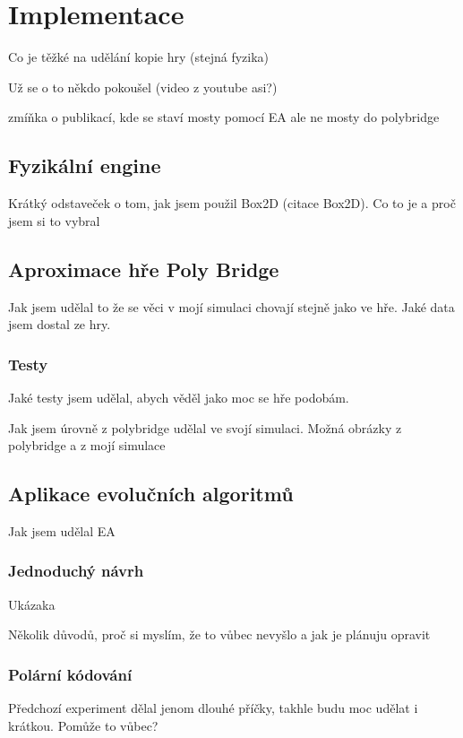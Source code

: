 \chapter{Implementace}

Co je těžké na udělání kopie hry (stejná fyzika)

Už se o to někdo pokoušel (video z youtube asi?)

zmíňka o publikací, kde se staví mosty pomocí EA ale ne mosty do polybridge


\section{Fyzikální engine}

Krátký odstaveček o tom, jak jsem použil Box2D (citace Box2D). Co to je a proč jsem si to vybral

\section{Aproximace hře Poly Bridge}

Jak jsem udělal to že se věci v mojí simulaci chovají stejně jako ve hře.
Jaké data jsem dostal ze hry. 

\subsection{Testy}

Jaké testy jsem udělal, abych věděl jako moc se hře podobám. 


Jak jsem úrovně z polybridge udělal ve svojí simulaci. Možná obrázky z polybridge a z mojí simulace

\section{Aplikace evolučních algoritmů}

Jak jsem udělal EA
\subsection{Jednoduchý návrh}

Ukázaka

Několik důvodů, proč si myslím, že to vůbec nevyšlo a jak je plánuju opravit

\subsection{Polární kódování}
Předchozí experiment dělal jenom dlouhé příčky, takhle budu moc udělat i krátkou. Pomůže to vůbec?

